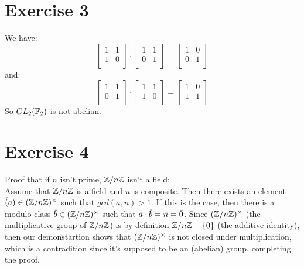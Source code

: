 \documentclass[12pt]{article}
\begin{document}
    \section*{Exercise 3}
    We have:
    \[ \begin{bmatrix}
        1 & 1 \\
        1 & 0 \\
    \end{bmatrix} \cdot
    \begin{bmatrix}
        1 & 1 \\
        0 & 1 \\
    \end{bmatrix}
    = \begin{bmatrix}
        1 & 0 \\
        0 & 1 \\
    \end{bmatrix} \]
    and: 
    \[ \begin{bmatrix}
        1 & 1 \\
        0 & 1 \\
    \end{bmatrix} \cdot
    \begin{bmatrix}
        1 & 1 \\
        1 & 0 \\
    \end{bmatrix}
    = \begin{bmatrix}
        1 & 0 \\
        1 & 1 \\
    \end{bmatrix} \]
    So $GL_2(\mathbb{F}_2)$ is not abelian.


    \section*{Exercise 4}
    Proof that if $n$ isn't prime, $\mathbb{Z}/n\mathbb{Z}$ isn't a field: \\
    Assume that $\mathbb{Z}/n\mathbb{Z}$ is a field and $n$ is composite.
    Then there exists an element $\,\overline{\!{(}}a) \in (\mathbb{Z}/n\mathbb{Z})^\times$
    such that $gcd(a, n) > 1$.
    If this is the case,
    then there is a modulo class $\,\overline{\!{b}} \in (\mathbb{Z}/n\mathbb{Z})^\times$
    such that $\,\overline{\!{a}} \cdot \,\overline{\!{b}} = \,\overline{\!{n}} = \,\overline{\!{0}}$.
    Since $(\mathbb{Z}/n\mathbb{Z})^\times$ (the multiplicative group of $\mathbb{Z}/n\mathbb{Z}$)
    is by definition $\mathbb{Z}/n\mathbb{Z} - \{0\}$ (the additive identity),
    then our demonstartion shows that $(\mathbb{Z}/n\mathbb{Z})^\times$ is not closed
    under multiplication, which is a contradition since it's supposed to
    be an (abelian) group, completing the proof.
\end{document}
